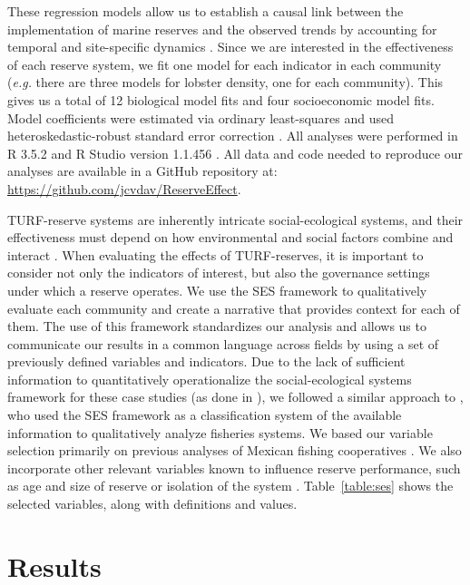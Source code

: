 \documentclass[10pt,letterpaper]{article}
\begin{document}
These regression models allow us to establish a causal link between the implementation of marine reserves and the observed trends by accounting for temporal and site-specific dynamics \cite{depalma_2018}. Since we are interested in the effectiveness of each reserve system, we fit one model for each indicator in each community (\emph{e.g.} there are three models for lobster density, one for each community). This gives us a total of 12 biological model fits and four socioeconomic model fits. Model coefficients were estimated via ordinary least-squares and used heteroskedastic-robust standard error correction \cite{zeileis_2004-7n}. All analyses were performed in R 3.5.2 and R Studio version 1.1.456 \cite{R_2018}. All data and code needed to reproduce our analyses are available in a GitHub repository at: \url{https://github.com/jcvdav/ReserveEffect}.

TURF-reserve systems are inherently intricate social-ecological systems, and their effectiveness must depend on how environmental and social factors combine and interact \cite{ostrom_2009,gelcich_2015}. When evaluating the effects of TURF-reserves, it is important to consider not only the indicators of interest, but also the governance settings under which a reserve operates. We use the SES framework to qualitatively evaluate each community and create a narrative that provides context for each of them. The use of this framework standardizes our analysis and allows us to communicate our results in a common language across fields by using a set of previously defined variables and indicators. Due to the lack of sufficient information to quantitatively operationalize the social-ecological systems framework for these case studies (as done in \cite{leslie_2015-na}), we followed a similar approach to \cite{basurto_2013-oq}, who used the SES framework as a classification system of the available information to qualitatively analyze fisheries systems. We based our variable selection primarily on previous analyses of Mexican fishing cooperatives \cite{leslie_2015-na,basurto_2013-oq}. We also incorporate other relevant variables known to influence reserve performance, such as age and size of reserve or isolation of the system \cite{difranco_2016-Xw,edgar_2014-UO}. Table~\ref{table:ses} shows the selected variables, along with definitions and values.

\section*{Results}
\end{document}
